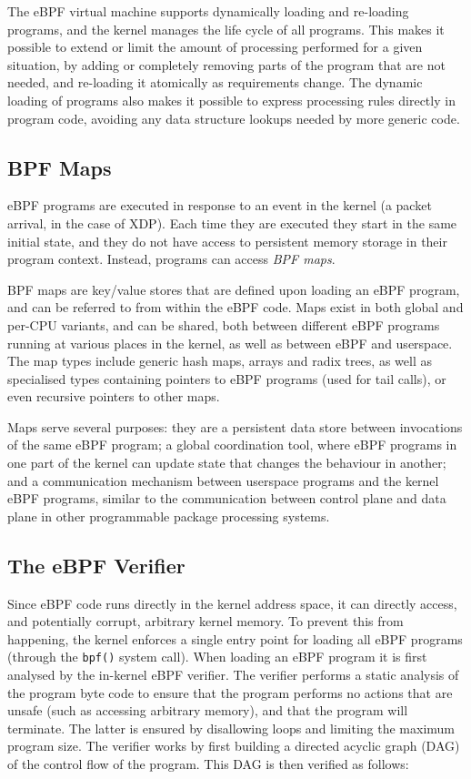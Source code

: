 \documentclass[sigconf]{acmart}
\begin{document}
The eBPF virtual machine supports dynamically loading and re-loading programs,
and the kernel manages the life cycle of all programs. This makes it possible to
extend or limit the amount of processing performed for a given situation, by
adding or completely removing parts of the program that are not needed, and
re-loading it atomically as requirements change. The dynamic loading of programs
also makes it possible to express processing rules directly in program code,
avoiding any data structure lookups needed by more generic code.

\subsection{BPF Maps}
\label{sec:bpf-maps}
eBPF programs are executed in response to an event in the kernel (a packet
arrival, in the case of XDP). Each time they are executed they start in the same
initial state, and they do not have access to persistent memory storage in their
program context. Instead, programs can access \emph{BPF maps}.

BPF maps are key/value stores that are defined upon loading an eBPF program, and
can be referred to from within the eBPF code. Maps exist in both global and
per-CPU variants, and can be shared, both between different eBPF programs
running at various places in the kernel, as well as between eBPF and userspace.
The map types include generic hash maps, arrays and radix trees, as well as
specialised types containing pointers to eBPF programs (used for tail calls), or
even recursive pointers to other maps.

Maps serve several purposes: they are a persistent data store between
invocations of the same eBPF program; a global coordination tool, where eBPF
programs in one part of the kernel can update state that changes the behaviour
in another; and a communication mechanism between userspace programs and the
kernel eBPF programs, similar to the communication between control plane and
data plane in other programmable package processing systems.

\subsection{The eBPF Verifier}
\label{sec:bpf-verifier}
Since eBPF code runs directly in the kernel address space, it can directly
access, and potentially corrupt, arbitrary kernel memory. To prevent this from
happening, the kernel enforces a single entry point for loading all eBPF
programs (through the \texttt{bpf()} system call). When loading an eBPF program
it is first analysed by the in-kernel eBPF verifier. The verifier performs a
static analysis of the program byte code to ensure that the program performs no
actions that are unsafe (such as accessing arbitrary memory), and that the
program will terminate. The latter is ensured by disallowing loops and limiting
the maximum program size. The verifier works by first building a directed
acyclic graph (DAG) of the control flow of the program. This DAG is then
verified as follows:
\end{document}
